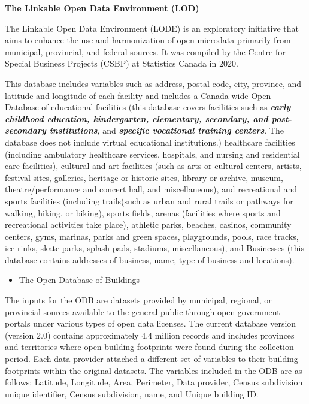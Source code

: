 \documentclass[
11pt, %
oneside, %
english, %
singlespacing, %
]{macthesis} %
\def\tightlist{}
\begin{document}
\textbf{The Linkable Open Data Environment (LOD)}

The Linkable Open Data Environment (LODE) is an exploratory initiative that aims to enhance the use and harmonization of open microdata primarily from municipal, provincial, and federal sources. It was compiled by the Centre for Special Business Projects (CSBP) at Statistics Canada in 2020.

This database includes variables such as address, postal code, city, province, and latitude and longitude of each facility and includes a Canada-wide Open Database of educational facilities (this database covers facilities such as \textbf{\emph{early childhood education, kindergarten, elementary, secondary, and post-secondary institutions}}, and \textbf{\emph{specific vocational training centers}}. The database does not include virtual educational institutions.) healthcare facilities (including ambulatory healthcare services, hospitals, and nursing and residential care facilities), cultural and art facilities (such as arts or cultural centers, artists, festival sites, galleries, heritage or historic sites, library or archive, museum, theatre/performance and concert hall, and miscellaneous), and recreational and sports facilities (including trails(such as urban and rural trails or pathways for walking, hiking, or biking), sports fields, arenas (facilities where sports and recreational activities take place), athletic parks, beaches, casinos, community centers, gyms, marinas, parks and green spaces, playgrounds, pools, race tracks, ice rinks, skate parks, splash pads, stadiums, miscellaneous), and Businesses (this database contains addresses of business, name, type of business and locations).

\begin{itemize}
\tightlist
\item
  \href{https://www.statcan.gc.ca/en/lode/databases/odb}{The Open Database of Buildings}
\end{itemize}

The inputs for the ODB are datasets provided by municipal, regional, or provincial sources available to the general public through open government portals under various types of open data licenses. The current database version (version 2.0) contains approximately 4.4 million records and includes provinces and territories where open building footprints were found during the collection period. Each data provider attached a different set of variables to their building footprints within the original datasets. The variables included in the ODB are as follows: Latitude, Longitude, Area, Perimeter, Data provider, Census subdivision unique identifier, Census subdivision, name, and Unique building ID.
\end{document}
